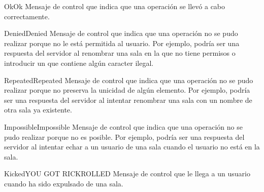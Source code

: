 \begin{displayControlMessage}{Ok}{Ok}
Mensaje de control que indica que una operación se llevó a cabo correctamente.
\end{displayControlMessage}
\begin{displayControlMessage}{Denied}{Denied}
Mensaje de control que indica que una operación no se pudo realizar porque no le está permitida al usuario. Por ejemplo, podría ser una respuesta del servidor al renombrar una sala en la que no tiene permisos o introducir un  que contiene algún caracter ilegal.
\end{displayControlMessage}
\begin{displayControlMessage}{Repeated}{Repeated}
Mensaje de control que indica que una operación no se pudo realizar porque no preserva la unicidad de algún elemento. Por ejemplo, podría ser una respuesta del servidor al intentar renombrar una sala con un nombre de otra sala ya existente.
\end{displayControlMessage}
\begin{displayControlMessage}{Impossible}{Impossible}
Mensaje de control que indica que una operación no se pudo realizar porque no es posible. Por ejemplo, podría ser una respuesta del servidor al intentar echar a un usuario de una sala cuando el usuario no está en la sala.
\end{displayControlMessage}
\begin{displayControlMessage}{Kicked}{YOU GOT RICKROLLED}
Mensaje de control que le llega a un usuario cuando ha sido expulsado de una sala.
\end{displayControlMessage}

